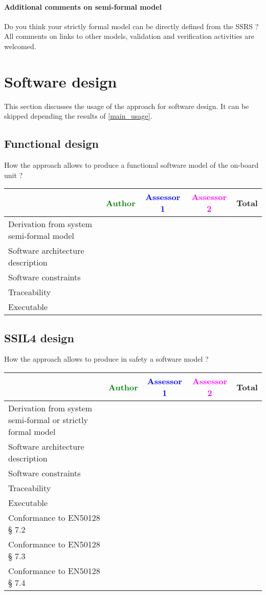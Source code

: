 \paragraph{Additional comments on semi-formal  model} Do you think your strictly formal  model can be directly defined from the SSRS ?
All comments on links to  other models, validation and verification activities are welcomed.


\section{Software design}
This section discusses the usage of the approach for software design.
It can be skipped depending the results of \ref{main_usage}.

\subsection{Functional design}

How the approach allows to  produce a functional software model of the on-board unit ?

\begin{tabular}{|l | c | c | c | c|}
\hline
& \textcolor{green}{Author} & \textcolor{blue}{Assessor 1} & \textcolor{magenta}{Assessor 2} & Total \\
\hline
Derivation from system semi-formal model  & & & &  \\
\hline 
Software architecture description  & & & &  \\
\hline
Software constraints  & & & &  \\
\hline
Traceability  & & & &  \\
\hline
Executable  & & & &  \\
\hline
\end{tabular}

\subsection{SSIL4 design}

How the approach allows to  produce in safety a software model ?

\begin{tabular}{|l | c | c | c | c|}
\hline
& \textcolor{green}{Author} & \textcolor{blue}{Assessor 1} & \textcolor{magenta}{Assessor 2} & Total \\
\hline
Derivation from system semi-formal or strictly formal model  & & & &  \\
\hline 
Software architecture description  & & & &  \\
\hline
Software constraints  & & & &  \\
\hline
Traceability  & & & &  \\
\hline
Executable  & & & &  \\
\hline
Conformance to EN50128 § 7.2  & & & &  \\
\hline
Conformance to EN50128 § 7.3  & & & &  \\
\hline
Conformance to EN50128 § 7.4  & & & &  \\
\hline
\end{tabular}

